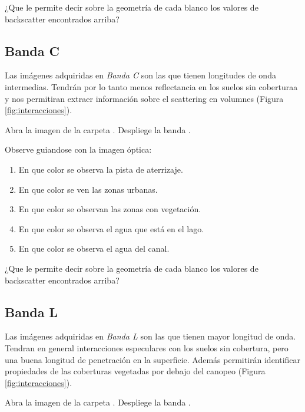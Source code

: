 \begin{que}
    ¿Que le permite decir sobre la geometría de cada blanco los valores de backscatter encontrados arriba?
\end{que}

\subsection{Banda C}

Las imágenes adquiridas en \emph{Banda C} son las que tienen longitudes de onda intermedias. Tendrán por lo tanto menos reflectancia en los suelos sin coberturaa y nos permitiran extraer información sobre el scattering en volumnes (Figura \ref{fig:interacciones}).

Abra la imagen  de la carpeta . Despliege la banda .

Observe guiandose con la imagen óptica:

\begin{enumerate}
    \item En que color se observa la pista de aterrizaje.
    \item En que color se ven las zonas urbanas.
    \item En que color se observan las zonas con vegetación.
    \item En que color se observa el agua que está en el lago.
    \item En que color se observa el agua del canal.
\end{enumerate}

\begin{que}
    ¿Que le permite decir sobre la geometría de cada blanco los valores de backscatter encontrados arriba?
\end{que}
\subsection{Banda L}

Las imágenes adquiridas en \emph{Banda L} son las que tienen mayor longitud de onda. Tendran en general interacciones especulares con los suelos sin cobertura, pero una buena longitud de penetración en la superficie. Además permitirán identificar propiedades de las coberturas vegetadas por debajo del canopeo (Figura \ref{fig:interacciones}).

Abra la imagen  de la carpeta . Despliege la banda .


